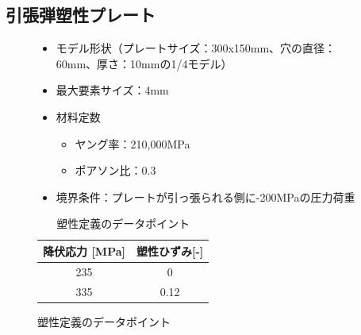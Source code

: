 \documentclass[a4j,20pt,slide]{ltjsarticle}
\begin{document}
\subsection{引張弾塑性プレート}
\begin{figure}[H]
	\begin{minipage}{.59\hsize}
		\begin{itemize}
			\item モデル形状（プレートサイズ：300x150mm、穴の直径：60mm、厚さ：10mmの1/4モデル）
			\item 最大要素サイズ：4mm
			\item 材料定数
			      \begin{itemize}
				      \item ヤング率：210,000MPa
				      \item ポアソン比：0.3
			      \end{itemize}
			\item 境界条件：プレートが引っ張られる側に-200MPaの圧力荷重
		\end{itemize}
	\end{minipage}
	\begin{minipage}{.39\hsize}
		\begin{table}[H]
			\centering
			\caption{塑性定義のデータポイント}
			\begin{tabular}{@{}cc@{}}
				\toprule
				降伏応力 {[}MPa{]} & 塑性ひずみ{[}-{]} \\ \midrule
				235                & 0                 \\
				335                & 0.12              \\ \bottomrule
			\end{tabular}
		\end{table}
	\end{minipage}
\end{figure}
\vspace{-\baselineskip}
\end{document}
